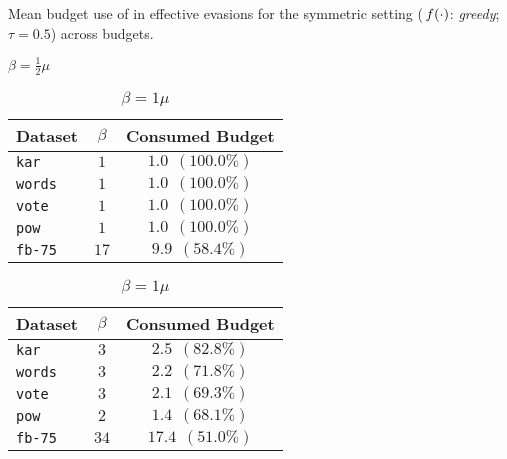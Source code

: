 \begin{table}[htpb]
    \centering
    \caption{Mean budget use of \method{} in effective evasions for the symmetric setting (\,$f(\cdot)$: \textit{greedy}; $\tau=0.5$) across budgets.}
    \label{tab:used_budget}
    \begin{subtable}[b]{0.33\linewidth}
        \centering
        \caption{$\beta=\frac{1}{2}\mu$}
        \label{tab:used_budget_beta05}
        \begin{tabular}{ l c c }
            \toprule
            {\textbf{Dataset}} &  
            {$\beta$} & {Consumed Budget}  \\
            \midrule
            \rowcolor[gray]{0.95} \texttt{kar} & $1$ & $1.0 \ \ (100.0\%)$ \\
            \texttt{words} & $1$ & $1.0 \ \ (100.0\%)$ \\
            \rowcolor[gray]{0.95} \texttt{vote} & $1$ & $1.0 \ \ (100.0\%)$ \\
            \texttt{pow} & $1$ & $1.0 \ \ (100.0\%)$ \\
            \rowcolor[gray]{0.95}\texttt{fb-75} & $17$ & $9.9 \ \ (58.4\%)$ \\
            \bottomrule
        \end{tabular}
    \end{subtable}
    \hfill
    \begin{subtable}[b]{0.33\linewidth}
    \centering
    \caption{$\beta=1\mu$}
    \label{tab:used_budget_beta1}
    \begin{tabular}{ l c c }
        \toprule
        {\textbf{Dataset}} &  
        {$\beta$} & {Consumed Budget}  \\
        \midrule
        \rowcolor[gray]{0.95} \texttt{kar} &$3$ & $2.5 \ \ (82.8\%)$ \\
        \texttt{words} &$3$ & $2.2 \ \ (71.8\%)$ \\
        \rowcolor[gray]{0.95} \texttt{vote} &$3$ & $2.1 \ \ (69.3\%)$ \\
        \texttt{pow} &$2$ & $1.4 \ \ (68.1\%)$ \\
        \rowcolor[gray]{0.95}\texttt{fb-75} &$34$ & $17.4 \ \ (51.0\%)$ \\
        \bottomrule
    \end{tabular}
    \end{subtable}
    \hfill
    \begin{subtable}[b]{0.33\linewidth}

\end{subtable}
\end{table}
